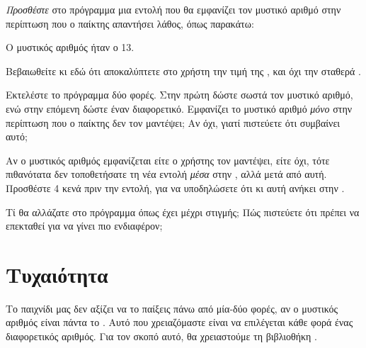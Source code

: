 \documentclass[a4paper,11pt,oneside]{book}
\begin{document}
\begin{step}
\label{step:secret-print}

\emph{Προσθέστε} στο πρόγραμμα μια εντολή που θα εμφανίζει τον μυστικό αριθμό στην περίπτωση που ο παίκτης απαντήσει λάθος, όπως παρακάτω:

\marginnote[16pt]{\iconcomputer}
\begin{pyterm}
Ο μυστικός αριθμός ήταν ο 13.
\end{pyterm}

\begin{note}
Βεβαιωθείτε κι εδώ ότι αποκαλύπτετε στο χρήστη την τιμή της , και όχι την σταθερά .
\end{note}

Εκτελέστε το πρόγραμμα δύο φορές. Στην πρώτη δώστε σωστά τον μυστικό αριθμό, ενώ στην επόμενη δώστε έναν διαφορετικό. Εμφανίζει το μυστικό αριθμό \emph{μόνο} στην περίπτωση που ο παίκτης δεν τον μαντέψει; Αν όχι, γιατί πιστεύετε ότι συμβαίνει αυτό;

\marginnote[14pt]{\icondiscuss}
\dottedline

\dottedline

\marginnote[16pt]{\iconcaution}
Αν ο μυστικός αριθμός εμφανίζεται είτε ο χρήστης τον μαντέψει, είτε όχι, τότε πιθανότατα δεν τοποθετήσατε τη νέα εντολή \emph{μέσα} στην , αλλά μετά από αυτή. Προσθέστε 4 κενά πριν την εντολή, για να υποδηλώσετε ότι κι αυτή ανήκει στην .

Τί θα αλλάζατε στο πρόγραμμα όπως έχει μέχρι στιγμής; Πώς πιστεύετε ότι πρέπει να επεκταθεί για να γίνει πιο ενδιαφέρον;

\marginnote[14pt]{\icondiscuss}
\dottedline

\dottedline
\end{step}


\section{Τυχαιότητα}

Το παιχνίδι μας δεν αξίζει να το παίξεις πάνω από μία-δύο φορές, αν ο μυστικός αριθμός είναι πάντα το . Αυτό που χρειαζόμαστε είναι να επιλέγεται κάθε φορά ένας διαφορετικός αριθμός.
Για τον σκοπό αυτό, θα χρειαστούμε τη βιβλιοθήκη .
\end{document}
